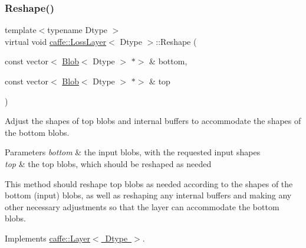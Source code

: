 \subsubsection{\texorpdfstring{Reshape()}{Reshape()}\hspace{0.1cm}{\footnotesize\ttfamily [1/2]}}
{\footnotesize\ttfamily template$<$typename Dtype $>$ \\
virtual void \mbox{\hyperlink{classcaffe_1_1_loss_layer}{caffe\+::\+Loss\+Layer}}$<$ Dtype $>$\+::Reshape (\begin{DoxyParamCaption}\item[{const vector$<$ \mbox{\hyperlink{classcaffe_1_1_blob}{Blob}}$<$ Dtype $>$ $\ast$$>$ \&}]{bottom,  }\item[{const vector$<$ \mbox{\hyperlink{classcaffe_1_1_blob}{Blob}}$<$ Dtype $>$ $\ast$$>$ \&}]{top }\end{DoxyParamCaption})\hspace{0.3cm}{\ttfamily [virtual]}}



Adjust the shapes of top blobs and internal buffers to accommodate the shapes of the bottom blobs. 


\begin{DoxyParams}{Parameters}
{\em bottom} & the input blobs, with the requested input shapes \\
\hline
{\em top} & the top blobs, which should be reshaped as needed\\
\hline
\end{DoxyParams}
This method should reshape top blobs as needed according to the shapes of the bottom (input) blobs, as well as reshaping any internal buffers and making any other necessary adjustments so that the layer can accommodate the bottom blobs. 

Implements \mbox{\hyperlink{classcaffe_1_1_layer_a7fe981e8af8d93d587acf2a952be563d}{caffe\+::\+Layer$<$ Dtype $>$}}.



